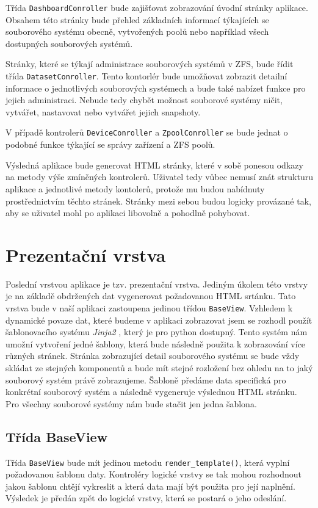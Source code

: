    Třída \verb|DashboardConroller| bude zajišťovat zobrazování úvodní stránky aplikace. Obsahem této stránky bude přehled základních informací týkajících se souborového systému obecně, vytvořených poolů nebo například všech dostupných souborových systémů.

    Stránky, které se týkají administrace souborových systémů v ZFS, bude řídit třída \verb|DatasetConroller|. Tento kontorlér bude umožňovat zobrazit detailní informace o jednotlivých souborových systémech a bude také nabízet funkce pro jejich administraci. Nebude tedy chybět možnost souborové systémy ničit, vytvářet, nastavovat nebo vytvářet jejich snapshoty.

    V případě kontrolerů \verb|DeviceConroller| a \verb|ZpoolConroller| se bude jednat o podobné funkce týkající se správy zařízení a ZFS poolů.

    Výsledná aplikace bude generovat HTML stránky, které v sobě ponesou odkazy na metody výše zmíněných kontrolerů. Uživatel tedy vůbec nemusí znát strukturu aplikace a jednotlivé metody kontolerů, protože mu budou nabídnuty prostřednictvím těchto stránek. Stránky mezi sebou budou logicky provázané tak, aby se uživatel mohl po aplikaci libovolně a pohodlně pohybovat.

\section{Prezentační vrstva}
Poslední vrstvou aplikace je tzv. prezentační vrstva. Jediným úkolem této vrstvy je na základě obdržených dat vygenerovat požadovanou HTML srtánku. Tato vrstva bude v naší aplikaci zastoupena jedinou třídou \verb|BaseView|. Vzhledem k dynamické povaze dat, které budeme v aplikaci zobrazovat jsem se rozhodl použít šablonovacího systému \emph{Jinja2} \cite{jinja2}, který je pro python dostupný. Tento systém nám umožní vytvoření jedné šablony, která bude následně použita k zobrazování více různých stránek. Stránka zobrazující detail souborového systému se bude vždy skládat ze stejných komponentů a bude mít stejné rozložení bez ohledu na to jaký souborový systém právě zobrazujeme. Šabloně předáme data specifická pro konkrétní souborový systém a následně vygeneruje výslednou HTML stránku. Pro všechny souborové systémy nám bude stačit jen jedna šablona.
    \subsection{Třída BaseView}
    Třída \verb|BaseView| bude mít jedinou metodu \verb|render_template()|, která vyplní požadovanou šablonu daty. Kontroléry logické vrstvy se tak mohou rozhodnout jakou šablonu chtějí vykreslit a která data mají být použita pro její naplnění. Výsledek je předán zpět do logické vrstvy, která se postará o jeho odeslání.
